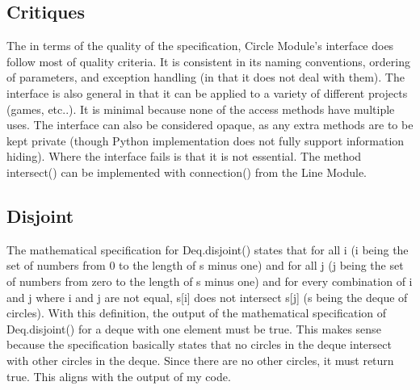 \documentclass{article}
\begin{document}
\subsection{Critiques}
{ 
\indent \indent The in terms of the quality of the specification, Circle Module's interface does follow most of quality criteria. It is consistent in its naming conventions, ordering of parameters, and exception handling (in that it does not deal with them). The interface is also general in that it can be applied to a variety of different projects (games, etc..). It is minimal because none of the access methods have multiple uses. The interface can also be considered opaque, as any extra methods are to be kept private (though Python implementation does not fully support information hiding). Where the interface fails is that it is not essential. The method intersect() can be implemented with connection() from the Line Module.

}

\subsection{Disjoint}
{ 
\indent \indent The mathematical specification for Deq.disjoint() states that for all i (i being the set of numbers from 0 to the length of s minus one) and for all j (j being the set of numbers from zero to the length of s minus one) and for every combination of i and j where i and j are not equal, s[i] does not intersect s[j] (s being the deque of circles). With this definition, the output of the mathematical specification of Deq.disjoint() for a deque with one element must be true. This makes sense because the specification basically states that no circles in the deque intersect with other circles in the deque. Since there are no other circles, it must return true. This aligns with the output of my code.

}
\end{document}
